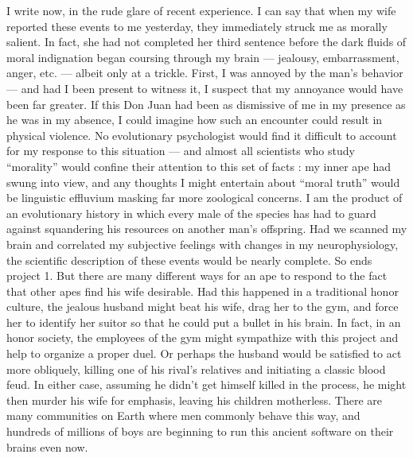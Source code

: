 \documentclass[a4paper,14pt]{extbook}
\begin{document}
I write now, in the rude glare of recent experience.
I can say that when my wife reported these events to me yesterday, they immediately struck me as morally salient.
In fact, she had not completed her third sentence before the dark fluids of moral indignation began coursing through my brain --- jealousy, embarrassment, anger, etc. --- albeit only at a trickle.
First, I was annoyed by the man's behavior --- and had I been present to witness it, I suspect that my annoyance would have been far greater.
If this Don Juan had been as dismissive of me in my presence as he was in my absence, I could imagine how such an encounter could result in physical violence.
No evolutionary psychologist would find it difficult to account for my response to this situation --- and almost all scientists who study ``morality'' would confine their attention to this set of facts :
my inner ape had swung into view, and any thoughts I might entertain about ``moral truth'' would be linguistic effluvium masking far more zoological concerns.
I am the product of an evolutionary history in which every male of the species has had to guard against squandering his resources on another man's offspring.
Had we scanned my brain and correlated my subjective feelings with changes in my neurophysiology, the scientific description of these events would be nearly complete.
So ends project 1.
But there are many different ways for an ape to respond to the fact that other apes find his wife desirable.
Had this happened in a traditional honor culture, the jealous husband might beat his wife, drag her to the gym, and force her to identify her suitor so that he could put a bullet in his brain.
In fact, in an honor society, the employees of the gym might sympathize with this project and help to organize a proper duel.
Or perhaps the husband would be satisfied to act more obliquely, killing one of his rival's relatives and initiating a classic blood feud.
In either case, assuming he didn't get himself killed in the process, he might then murder his wife for emphasis, leaving his children motherless.
There are many communities on Earth where men commonly behave this way, and hundreds of millions of boys are beginning to run this ancient software on their brains even now.
\end{document}
